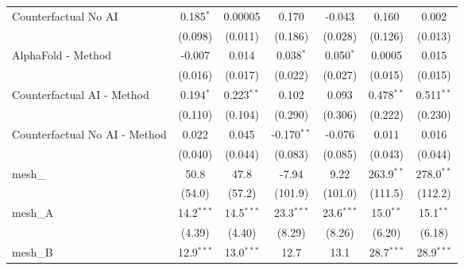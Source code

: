 \begin{tabular}{lcccccc}
   Counterfactual No AI                                        & 0.185$^{*}$    & 0.00005        & 0.170          & -0.043         & 0.160         & 0.002\\   
                                                               & (0.098)        & (0.011)        & (0.186)        & (0.028)        & (0.126)       & (0.013)\\   
   AlphaFold - Method                                          & -0.007         & 0.014          & 0.038$^{*}$    & 0.050$^{*}$    & 0.0005        & 0.015\\   
                                                               & (0.016)        & (0.017)        & (0.022)        & (0.027)        & (0.015)       & (0.015)\\   
   Counterfactual AI - Method                                  & 0.194$^{*}$    & 0.223$^{**}$   & 0.102          & 0.093          & 0.478$^{**}$  & 0.511$^{**}$\\   
                                                               & (0.110)        & (0.104)        & (0.290)        & (0.306)        & (0.222)       & (0.230)\\   
   Counterfactual No AI - Method                               & 0.022          & 0.045          & -0.170$^{**}$  & -0.076         & 0.011         & 0.016\\   
                                                               & (0.040)        & (0.044)        & (0.083)        & (0.085)        & (0.043)       & (0.044)\\   
   mesh\_                                                      & 50.8           & 47.8           & -7.94          & 9.22           & 263.9$^{**}$  & 278.0$^{**}$\\   
                                                               & (54.0)         & (57.2)         & (101.9)        & (101.0)        & (111.5)       & (112.2)\\   
   mesh\_A                                                     & 14.2$^{***}$   & 14.5$^{***}$   & 23.3$^{***}$   & 23.6$^{***}$   & 15.0$^{**}$   & 15.1$^{**}$\\   
                                                               & (4.39)         & (4.40)         & (8.29)         & (8.26)         & (6.20)        & (6.18)\\   
   mesh\_B                                                     & 12.9$^{***}$   & 13.0$^{***}$   & 12.7           & 13.1           & 28.7$^{***}$  & 28.9$^{***}$\\   

\end{tabular}
